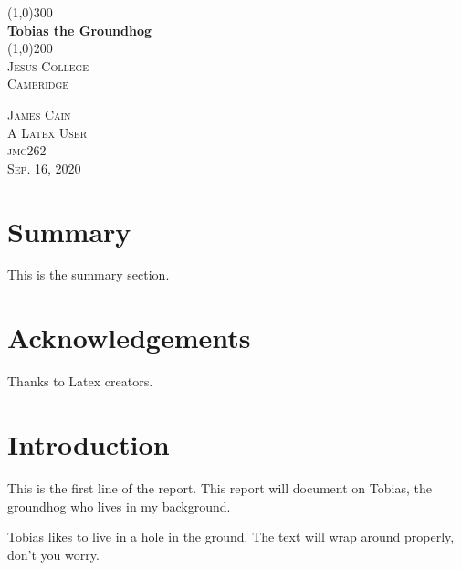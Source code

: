 \documentclass{article}
\begin{document}
\begin{titlepage}
    \begin{center}
    \line(1,0){300}\\
    [0.25in]
    \huge{\bfseries Tobias the Groundhog}\\
    [2mm]
    \line(1,0){200}\\
    [1.5cm]
    \textsc{\LARGE Jesus College}\\
    \textsc{\LARGE Cambridge}\\
    [10cm]
    \end{center}
    
    \begin{flushright}
    \textsc{\large James Cain \\
    A Latex User\\
    jmc262\\
    Sep. 16, 2020\\}
    \end{flushright}
\end{titlepage}

\section*{Summary}

This is the summary section. 
\cleardoublepage

\section*{Acknowledgements}
Thanks to Latex creators.
\cleardoublepage

\tableofcontents
\thispagestyle{empty}
\cleardoublepage

\listoffigures
{}
\cleardoublepage

\setcounter{page}{1}

\section{Introduction}\label{sec:intro}
This is the first line of the report. This report will document on Tobias, the groundhog who lives in my background.

Tobias likes to live in a hole in the ground. The text will wrap around properly, don't you worry.
\end{document}
